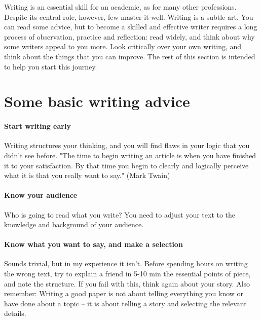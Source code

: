 \documentclass{tufte-book}
\begin{document}
Writing is an essential skill for an academic, as for many other professions.  Despite its central role, however, few master it well. Writing is a subtle art. You can read some advice, but to become a skilled and effective writer requires a long process of observation, practice and reflection: read widely, and think about why some writers appeal to you more. Look critically over your own writing, and think about the things that you can improve. The rest of this section is intended to help you start this journey. 

\section{Some basic writing advice}

\paragraph{Start writing early} Writing structures your thinking, and you will find flaws in your logic that you didn't see before. "The time to begin writing an article is when you have finished it to your satisfaction. By that time you begin to clearly and logically perceive what it is that you really want to say." (Mark Twain)

\paragraph{Know your audience} Who is going to read what you write?  You need to adjust your text to the knowledge and background of your audience. 


\paragraph{Know what you want to say, and make a selection} Sounds trivial, but in my experience it isn't. Before spending hours on writing the wrong text, try to explain a friend in 5-10 min the essential points of piece, and note the structure. If you fail with this, think again about your story. Also remember: Writing a good paper is not about telling everything you know or have done about a topic -- it is about telling a story and selecting the relevant details. 
\end{document}
